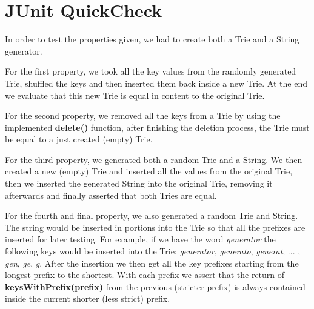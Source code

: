 \documentclass[12pt]{article}
\begin{document}
\section[JUnit QuickCheck]{JUnit QuickCheck}
In order to test the properties given, we had to create both a Trie and a String generator.

For the first property, we took all the key values from the randomly generated Trie, shuffled the keys and then inserted them back inside a new Trie. At the end we evaluate that this new Trie is equal in content to the original Trie.

For the second property, we removed all the keys from a Trie by using the implemented \textbf{delete()} function, after finishing the deletion process, the Trie must be equal to a just created (empty) Trie.

For the third property, we generated both a random Trie and a String. We then created a new (empty) Trie and inserted all the values from the original Trie, then we inserted the generated String into the original Trie, removing it afterwards and finally asserted that both Tries are equal.

For the fourth and final property, we also generated a random Trie and String. The string would be inserted in portions into the Trie so that all the prefixes are inserted for later testing. For example, if we have the word \textit{generator} the following keys would be inserted into the Trie: \textit{generator}, \textit{generato}, \textit{generat}, ... , \textit{gen}, \textit{ge}, \textit{g}. 
After the insertion we then get all the key prefixes starting from the longest prefix to the shortest. With each prefix we assert that the return of \textbf{keysWithPrefix(prefix)} from the previous (stricter prefix) is always contained inside the current shorter (less strict) prefix.
\end{document}
